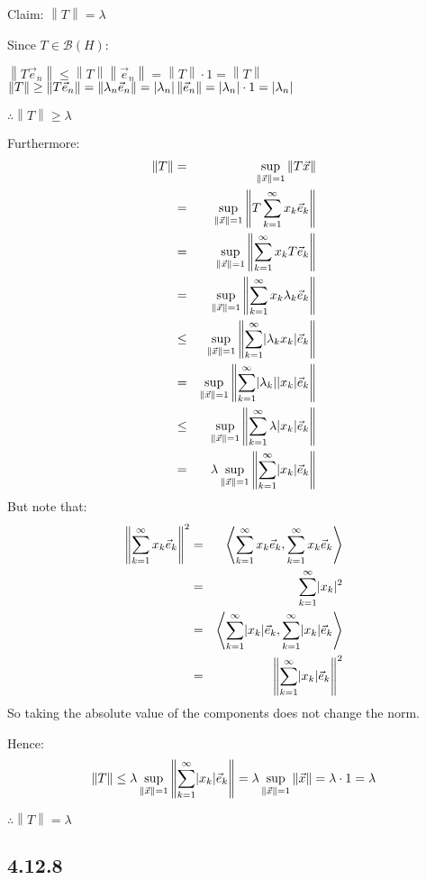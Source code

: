 \documentclass[letterpaper,12pt,fleqn]{article}
\newcommand{\ve}{\vec{e}}
\newcommand{\vx}{\vec{x}}
\newcommand{\norm}[1]{\left\|#1\right\|}
\newcommand{\inner}[1]{\left<#1\right>}
\renewcommand{\l}{\lambda}
\newcommand{\mb}{\mathcal{B}}
\begin{document}
\begin{enumerate}[label=(\alph*)]
  Claim: $\norm{T}=\l$

  Since $T\in\mb(H)$:

  $\norm{T\ve_n}\le\norm{T}\norm{\ve_n}=\norm{T}\cdot1=\norm{T}$ \\
  $\norm{T}\ge\norm{T\ve_n}=\norm{\l_n\ve_n}=\abs{\l_n}\norm{\ve_n}=
  \abs{\l_n}\cdot1=\abs{\l_n}$

  $\therefore\norm{T}\ge\l$

  Furthermore:
  \begin{eqnarray*}
    \norm{T} &=& \sup_{\norm{\vx}=1}\norm{T\vx} \\
    &=& \sup_{\norm{\vx}=1}\norm{T\sum_{k=1}^{\infty}x_k\ve_k} \\
    &=& \sup_{\norm{\vx}=1}\norm{\sum_{k=1}^{\infty}x_kT\ve_k} \\
    &=& \sup_{\norm{\vx}=1}\norm{\sum_{k=1}^{\infty}x_k\l_k\ve_k} \\
    &\le& \sup_{\norm{\vx}=1}\norm{\sum_{k=1}^{\infty}\abs{\l_kx_k}\ve_k} \\
    &=& \sup_{\norm{\vx}=1}\norm{\sum_{k=1}^{\infty}\abs{\l_k}\abs{x_k}\ve_k} \\
    &\le& \sup_{\norm{\vx}=1}\norm{\sum_{k=1}^{\infty}\l\abs{x_k}\ve_k} \\
    &=& \l\sup_{\norm{\vx}=1}\norm{\sum_{k=1}^{\infty}\abs{x_k}\ve_k}
  \end{eqnarray*}
  But note that:
  \begin{eqnarray*}
    \norm{\sum_{k=1}^{\infty}x_k\ve_k}^2 &=&
    \inner{\sum_{k=1}^{\infty}x_k\ve_k,\sum_{k=1}^{\infty}x_k\ve_k} \\
    &=& \sum_{k=1}^{\infty}\abs{x_k}^2 \\
    &=& \inner{\sum_{k=1}^{\infty}\abs{x_k}\ve_k,\sum_{k=1}^{\infty}\abs{x_k}\ve_k} \\
    &=& \norm{\sum_{k=1}^{\infty}\abs{x_k}\ve_k}^2
  \end{eqnarray*}
  So taking the absolute value of the components does not change the norm.

  Hence:
  \[\norm{T}\le\l\sup_{\norm{\vx}=1}\norm{\sum_{k=1}^{\infty}\abs{x_k}\ve_k}=
  \l\sup_{\norm{\vx}=1}\norm{\vx}=\l\cdot1=\l\]

  $\therefore\norm{T}=\l$
\end{enumerate}

\subsection*{4.12.8}
\end{document}
